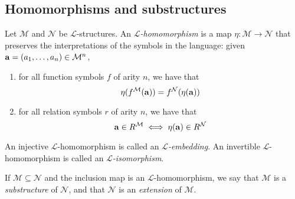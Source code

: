 \subsection{Homomorphisms and substructures}
\begin{definition}
    Let \( \mathcal M \) and \( \mathcal N \) be \( \mathcal L \)-structures.
    An \emph{\( \mathcal L \)-homomorphism} is a map \( \eta : \mathcal M \to \mathcal N \) that preserves the interpretations of the symbols in the language: given \( \vb a = (a_1, \dots, a_n) \in \mathcal M^n \),
    \begin{enumerate}
        \item for all function symbols \( f \) of arity \( n \), we have that
        \[ \eta(f^{\mathcal M}(\vb a)) = f^{\mathcal N}(\eta(\vb a)) \]
        \item for all relation symbols \( r \) of arity \( n \), we have that
        \[ \vb a \in R^{\mathcal M} \iff \eta(\vb a) \in R^{\mathcal N} \]
    \end{enumerate}
    An injective \( \mathcal L \)-homomorphism is called an \emph{\( \mathcal L \)-embedding}.
    An invertible \( \mathcal L \)-homomorphism is called an \emph{\( \mathcal L \)-isomorphism}.
\end{definition}
\begin{definition}
    If \( \mathcal M \subseteq \mathcal N \) and the inclusion map is an \( \mathcal L \)-homomorphism, we say that \( \mathcal M \) is a \emph{substructure} of \( \mathcal N \), and that \( \mathcal N \) is an \emph{extension} of \( \mathcal M \).
\end{definition}
